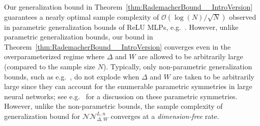 \documentclass{article}
\numberwithin{equation}{section}
\theoremstyle{definition}
\begin{document}
Our generalization bound in Theorem~\ref{thm:RademacherBound__IntroVersion} guarantees a nearly optimal sample complexity of $\mathcal{O}(\log(N)/\sqrt{N})$ observed in parametric generalization bounds of ReLU MLPs, e.g.~\cite{neyshabur2015pathSGD_NIPS,bartlett2017spectrally,BartlettHarveyChristopherMehrabian_VCDimReLUMLPs_JMLR_2019}.  However, unlike parametric generalization bounds, our bound in Theorem~\ref{thm:RademacherBound__IntroVersion} converges even in the overparameterized regime where $\Delta$ and $W$ are allowed to be arbitrarily large (compared to the sample size $N$).  Typically, only non-parametric generalization bounds, such as e.g.~\cite{HouKratsios_JMLR_2023}, do not explode when $\Delta$ and $W$ are taken to be arbitrarily large since they can account for the enumerable parametric symmetries in large neural networks; see e.g.~\cite{entezari2021role,ainsworth2023git} for a discussion on these parametric symmetries.  However, unlike the non-parametric bounds, the sample complexity of generalization bound for $\mathcal{NN}_{\Delta,W}^{L,n}$ converges at a \textit{dimension-free} rate.
\end{document}
